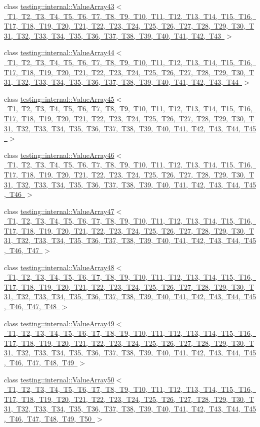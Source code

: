 \begin{DoxyCompactItemize}
\item 
class \mbox{\hyperlink{classtesting_1_1internal_1_1ValueArray43}{testing\+::internal\+::\+Value\+Array43$<$ T1, T2, T3, T4, T5, T6, T7, T8, T9, T10, T11, T12, T13, T14, T15, T16, T17, T18, T19, T20, T21, T22, T23, T24, T25, T26, T27, T28, T29, T30, T31, T32, T33, T34, T35, T36, T37, T38, T39, T40, T41, T42, T43 $>$}}
\item 
class \mbox{\hyperlink{classtesting_1_1internal_1_1ValueArray44}{testing\+::internal\+::\+Value\+Array44$<$ T1, T2, T3, T4, T5, T6, T7, T8, T9, T10, T11, T12, T13, T14, T15, T16, T17, T18, T19, T20, T21, T22, T23, T24, T25, T26, T27, T28, T29, T30, T31, T32, T33, T34, T35, T36, T37, T38, T39, T40, T41, T42, T43, T44 $>$}}
\item 
class \mbox{\hyperlink{classtesting_1_1internal_1_1ValueArray45}{testing\+::internal\+::\+Value\+Array45$<$ T1, T2, T3, T4, T5, T6, T7, T8, T9, T10, T11, T12, T13, T14, T15, T16, T17, T18, T19, T20, T21, T22, T23, T24, T25, T26, T27, T28, T29, T30, T31, T32, T33, T34, T35, T36, T37, T38, T39, T40, T41, T42, T43, T44, T45 $>$}}
\item 
class \mbox{\hyperlink{classtesting_1_1internal_1_1ValueArray46}{testing\+::internal\+::\+Value\+Array46$<$ T1, T2, T3, T4, T5, T6, T7, T8, T9, T10, T11, T12, T13, T14, T15, T16, T17, T18, T19, T20, T21, T22, T23, T24, T25, T26, T27, T28, T29, T30, T31, T32, T33, T34, T35, T36, T37, T38, T39, T40, T41, T42, T43, T44, T45, T46 $>$}}
\item 
class \mbox{\hyperlink{classtesting_1_1internal_1_1ValueArray47}{testing\+::internal\+::\+Value\+Array47$<$ T1, T2, T3, T4, T5, T6, T7, T8, T9, T10, T11, T12, T13, T14, T15, T16, T17, T18, T19, T20, T21, T22, T23, T24, T25, T26, T27, T28, T29, T30, T31, T32, T33, T34, T35, T36, T37, T38, T39, T40, T41, T42, T43, T44, T45, T46, T47 $>$}}
\item 
class \mbox{\hyperlink{classtesting_1_1internal_1_1ValueArray48}{testing\+::internal\+::\+Value\+Array48$<$ T1, T2, T3, T4, T5, T6, T7, T8, T9, T10, T11, T12, T13, T14, T15, T16, T17, T18, T19, T20, T21, T22, T23, T24, T25, T26, T27, T28, T29, T30, T31, T32, T33, T34, T35, T36, T37, T38, T39, T40, T41, T42, T43, T44, T45, T46, T47, T48 $>$}}
\item 
class \mbox{\hyperlink{classtesting_1_1internal_1_1ValueArray49}{testing\+::internal\+::\+Value\+Array49$<$ T1, T2, T3, T4, T5, T6, T7, T8, T9, T10, T11, T12, T13, T14, T15, T16, T17, T18, T19, T20, T21, T22, T23, T24, T25, T26, T27, T28, T29, T30, T31, T32, T33, T34, T35, T36, T37, T38, T39, T40, T41, T42, T43, T44, T45, T46, T47, T48, T49 $>$}}
\item 
class \mbox{\hyperlink{classtesting_1_1internal_1_1ValueArray50}{testing\+::internal\+::\+Value\+Array50$<$ T1, T2, T3, T4, T5, T6, T7, T8, T9, T10, T11, T12, T13, T14, T15, T16, T17, T18, T19, T20, T21, T22, T23, T24, T25, T26, T27, T28, T29, T30, T31, T32, T33, T34, T35, T36, T37, T38, T39, T40, T41, T42, T43, T44, T45, T46, T47, T48, T49, T50 $>$}}
\end{DoxyCompactItemize}
